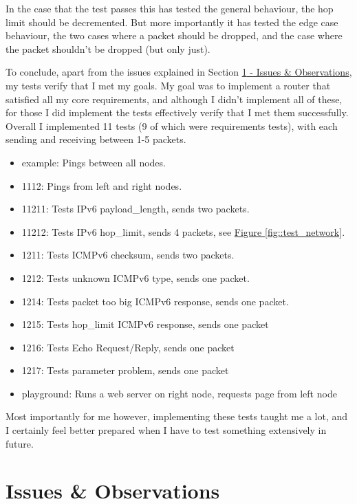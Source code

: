 \documentclass[12pt,a4paper,twoside,openany]{report}
\begin{document}
In the case that the test passes this has tested the general behaviour, the hop limit should be decremented. But more importantly it has tested the edge case behaviour, the two cases where a packet should be dropped, and the case where the packet shouldn't be dropped (but only just).

\bigskip

To conclude, apart from the issues explained in Section \ref{sec::issues_observations}\hyperref[sec::issues_observations]{ - Issues \& Observations}, my tests verify that I met my goals.  My goal was to implement a router that satisfied all my core requirements, and although I didn't implement all of these, for those I did implement the tests effectively verify that I met them successfully.  Overall I implemented 11 tests (9 of which were requirements tests), with each sending and receiving between 1-5 packets. 
\begin{itemize}
\item example: Pings between all nodes.
\item 1112: Pings from left and right nodes.
\item 11211: Tests IPv6 payload\_length, sends two packets.
\item 11212: Tests IPv6 hop\_limit, sends 4 packets, see \hyperref[fig::test_success]{Figure }\ref{fig::test_network}.
\item 1211: Tests ICMPv6 checksum, sends two packets.
\item 1212: Tests unknown ICMPv6 type, sends one packet.
\item 1214: Tests packet too big ICMPv6 response, sends one packet.
\item 1215: Tests hop\_limit ICMPv6 response, sends one packet
\item 1216: Tests Echo Request/Reply, sends one packet
\item 1217: Tests parameter problem, sends one packet
\item playground: Runs a web server on right node, requests page from left node
\end{itemize}
Most importantly for me however, implementing these tests taught me a lot, and I certainly feel better prepared when I have to test something extensively in future.

\section{Issues \& Observations}
\label{sec::issues_observations}
\end{document}
